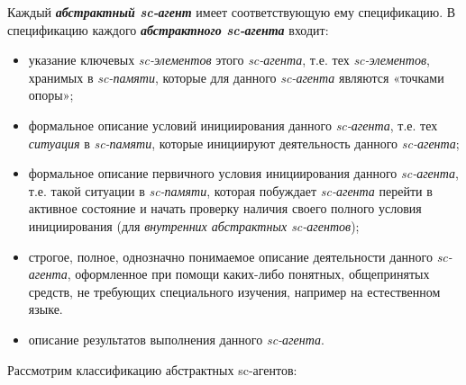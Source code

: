 Каждый \textbf{\textit{абстрактный sc-агент}} имеет соответствующую ему спецификацию. В спецификацию каждого \textbf{\textit{абстрактного sc-агента}} входит:
\begin{itemize}
	\item указание ключевых \textit{sc-элементов} этого \textit{sc-агента}, т.е. тех \textit{sc-элементов}, хранимых в \textit{sc-памяти}, которые для данного \textit{sc-агента} являются «точками опоры»;
	\item формальное описание условий инициирования данного \textit{sc-агента}, т.е. тех \textit{ситуация} в \textit{sc-памяти}, которые инициируют деятельность данного \textit{sc-агента};
	\item формальное описание первичного условия инициирования данного \textit{sc-агента}, т.е. такой ситуации в \textit{sc-памяти}, которая побуждает \textit{sc-агента} перейти в активное состояние и начать проверку наличия своего полного условия инициирования (для \textit{внутренних абстрактных sc-агентов});
	\item строгое, полное, однозначно понимаемое описание деятельности данного \textit{sc-агента}, оформленное при помощи каких-либо понятных, общепринятых средств, не требующих специального изучения, например на естественном языке.
	\item описание результатов выполнения данного \textit{sc-агента}.
\end{itemize}

Рассмотрим классификацию абстрактных sc-агентов:

